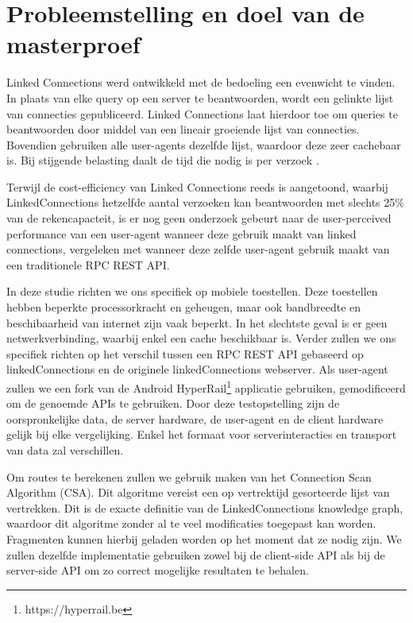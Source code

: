 \section{Probleemstelling en doel van de masterproef}
\label{sec:problem}

Linked Connections werd ontwikkeld met de bedoeling een evenwicht te vinden. In plaats van elke query op een server te beantwoorden, wordt een gelinkte lijst van connecties gepubliceerd. Linked Connections laat hierdoor toe om queries te beantwoorden door middel van een lineair groeiende lijst van connecties\citep{colpaert15}. Bovendien gebruiken alle user-agents dezelfde lijst, waardoor deze zeer cachebaar is. Bij stijgende belasting daalt de tijd die nodig is per verzoek \citep{colpaert17}.

Terwijl de cost-efficiency van Linked Connections reeds is aangetoond, waarbij LinkedConnections hetzelfde aantal verzoeken kan beantwoorden met slechts 25\% van de rekencapacteit\citep{colpaert17,Melendez17}, is er nog geen onderzoek gebeurt naar de user-perceived performance van een user-agent wanneer deze gebruik maakt van linked connections, vergeleken met wanneer deze zelfde user-agent gebruik maakt van een traditionele RPC REST API. 

In deze studie richten we ons specifiek op mobiele toestellen. Deze toestellen hebben beperkte processorkracht en geheugen, maar ook bandbreedte en beschibaarheid van internet zijn vaak beperkt. In het slechtste geval is er geen netwerkverbinding, waarbij enkel een cache beschikbaar is. Verder zullen we ons specifiek richten op het verschil tussen een RPC REST API gebaseerd op linkedConnections\citep{colpaert17} en de originele linkedConnections webserver. Als user-agent zullen we een fork van de Android HyperRail\footnote{https://hyperrail.be} applicatie gebruiken, gemodificeerd om de genoemde APIs te gebruiken. Door deze testopstelling zijn de oorspronkelijke data, de server hardware, de user-agent en de client hardware gelijk bij elke vergelijking. Enkel het formaat voor serverinteracties en transport van data zal verschillen.

Om routes te berekenen zullen we gebruik maken van het Connection Scan Algorithm (CSA). Dit algoritme vereist een op vertrektijd gesorteerde lijst van vertrekken. Dit is de exacte definitie van de LinkedConnections knowledge graph, waardoor dit algoritme zonder al te veel modificaties toegepast kan worden. Fragmenten kunnen hierbij geladen worden op het moment dat ze nodig zijn. We zullen dezelfde implementatie gebruiken zowel bij de client-side API als bij de server-side API om zo correct mogelijke resultaten te behalen. 

